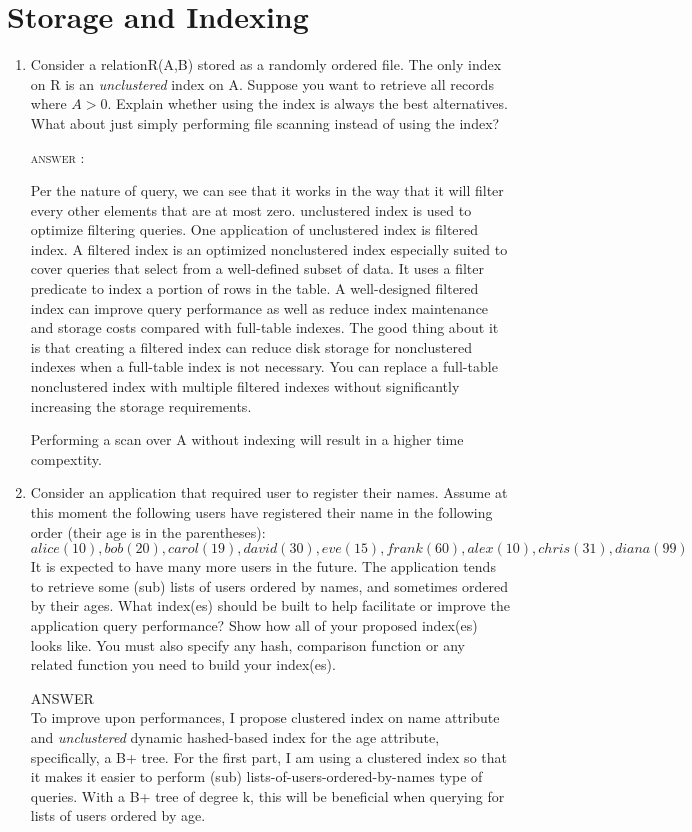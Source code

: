 \documentclass[a4paper, 11pt]{article}
\begin{document}
\section{Storage and Indexing }
\begin{enumerate}
\item Consider a relationR(A,B) stored as a randomly ordered file. The only index on R is an \textit{unclustered} index on A. Suppose you want to retrieve all records where $A > 0$. Explain whether using the index is always the best alternatives. What about just simply performing file scanning instead of using the index?

\textsc{answer : }

Per the nature of query, we can see that it works in the way that it will filter every other elements that are 
at most zero. unclustered index is used to optimize filtering queries. One application of unclustered index is
filtered index. A filtered index is an optimized nonclustered index especially suited to cover 
queries that select from a well-defined subset of data. It uses a filter predicate to index a portion of rows in 
the table. A well-designed filtered index can improve query performance as well as reduce index 
maintenance and storage costs compared with full-table indexes.
The good thing about it is that creating a filtered index can reduce disk storage for nonclustered indexes 
when a full-table index is not necessary. You can replace a full-table nonclustered index with 
multiple filtered indexes without significantly increasing the storage requirements.
 
Performing a scan over A without indexing will result in a higher time compextity. 

\item Consider an application that required user to register their names. Assume at this moment the following users have registered their name in the following order (their age is in the parentheses):
$$alice(10), bob(20), carol(19), david(30), eve(15), frank(60), alex(10), chris(31), diana(99)$$
It is expected to have many more users in the future. The application tends to retrieve some
(sub) lists of users ordered by names, and sometimes ordered by their ages.
What index(es) should be built to help facilitate or improve the application query performance? Show how all of your proposed index(es) looks like. You must also specify any hash, comparison function or any related function you need to build your index(es).

\textsc{ANSWER} \\
To  improve upon performances, I propose clustered index on name attribute and \textit{unclustered} dynamic hashed-based index for the age attribute, specifically, a B+ tree. For the first part, I am using a clustered index so that it makes it easier to perform (sub) lists-of-users-ordered-by-names type of queries. With a B+ tree of degree k, this will be beneficial when querying for lists of users ordered by age. 


\end{enumerate}
\end{document}
